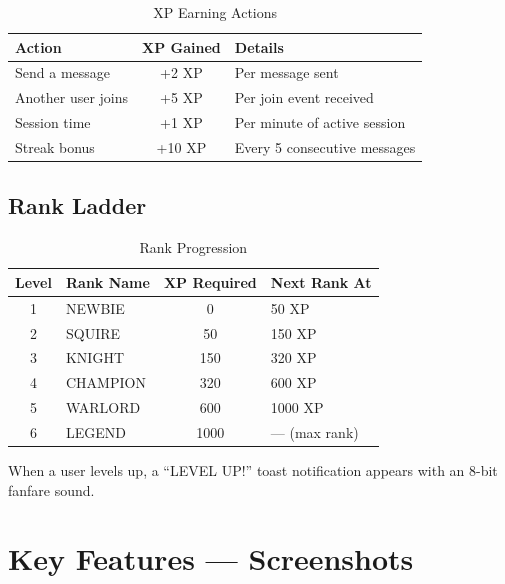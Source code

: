 \documentclass[12pt, a4paper]{article}
\begin{document}
\begin{table}[H]
    \centering
    \caption{XP Earning Actions}
    \begin{tabularx}{\textwidth}{l c X}
        \toprule
        \textbf{Action} & \textbf{XP Gained} & \textbf{Details} \\
        \midrule
        Send a message    & +2 XP & Per message sent \\
        Another user joins & +5 XP & Per join event received \\
        Session time       & +1 XP & Per minute of active session \\
        Streak bonus       & +10 XP & Every 5 consecutive messages \\
        \bottomrule
    \end{tabularx}
\end{table}

\subsection{Rank Ladder}

\begin{table}[H]
    \centering
    \caption{Rank Progression}
    \begin{tabularx}{\textwidth}{c l c X}
        \toprule
        \textbf{Level} & \textbf{Rank Name} & \textbf{XP Required} & \textbf{Next Rank At} \\
        \midrule
        1 & NEWBIE    & 0   & 50 XP \\
        2 & SQUIRE    & 50  & 150 XP \\
        3 & KNIGHT    & 150 & 320 XP \\
        4 & CHAMPION  & 320 & 600 XP \\
        5 & WARLORD   & 600 & 1000 XP \\
        6 & LEGEND    & 1000 & — (max rank) \\
        \bottomrule
    \end{tabularx}
\end{table}

When a user levels up, a ``LEVEL UP!'' toast notification appears with an 8-bit fanfare sound.


\section{Key Features — Screenshots}
\end{document}
